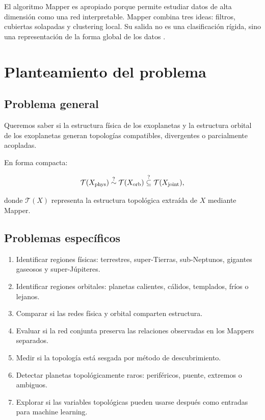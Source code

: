 \documentclass[11pt,letterpaper]{article}
\newcommand{\phys}{\rm phys}
\newcommand{\orb}{\rm orb}
\newcommand{\joint}{\rm joint}
\begin{document}
El algoritmo Mapper es apropiado porque permite estudiar datos de alta dimensión como una red interpretable. Mapper combina tres ideas: filtros, cubiertas solapadas y clustering local. Su salida no es una clasificación rígida, sino una representación de la forma global de los datos \cite{singh2007mapper}.

\section{Planteamiento del problema}

\subsection{Problema general}

Queremos saber si la estructura física de los exoplanetas y la estructura orbital de los exoplanetas generan topologías compatibles, divergentes o parcialmente acopladas.

En forma compacta:

\begin{equation}
\mathcal{T}(X_{\phys}) \overset{?}{\sim} \mathcal{T}(X_{\orb}) \overset{?}{\subseteq} \mathcal{T}(X_{\joint}),
\end{equation}

donde $\mathcal{T}(X)$ representa la estructura topológica extraída de $X$ mediante Mapper.

\subsection{Problemas específicos}

\begin{enumerate}
    \item Identificar regiones físicas: terrestres, super-Tierras, sub-Neptunos, gigantes gaseosos y super-Júpiteres.
    \item Identificar regiones orbitales: planetas calientes, cálidos, templados, fríos o lejanos.
    \item Comparar si las redes física y orbital comparten estructura.
    \item Evaluar si la red conjunta preserva las relaciones observadas en los Mappers separados.
    \item Medir si la topología está sesgada por método de descubrimiento.
    \item Detectar planetas topológicamente raros: periféricos, puente, extremos o ambiguos.
    \item Explorar si las variables topológicas pueden usarse después como entradas para machine learning.
\end{enumerate}
\end{document}

